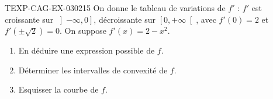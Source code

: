 \begin{exercice}{TEXP-CAG-EX-030}{2}{15}
On donne le tableau de variations de $f'$ : $f'$ est croissante sur $\left]-\infty, 0\right]$, décroissante sur $\left[0, +\infty\right[$, avec $f'(0) = 2$ et $f'(\pm\sqrt{2}) = 0$. On suppose $f'(x) = 2 - x^2$.
\begin{enumerate}
  \item En déduire une expression possible de $f$.
  \item Déterminer les intervalles de convexité de $f$.
  \item Esquisser la courbe de $f$.
\end{enumerate}

\end{exercice}
